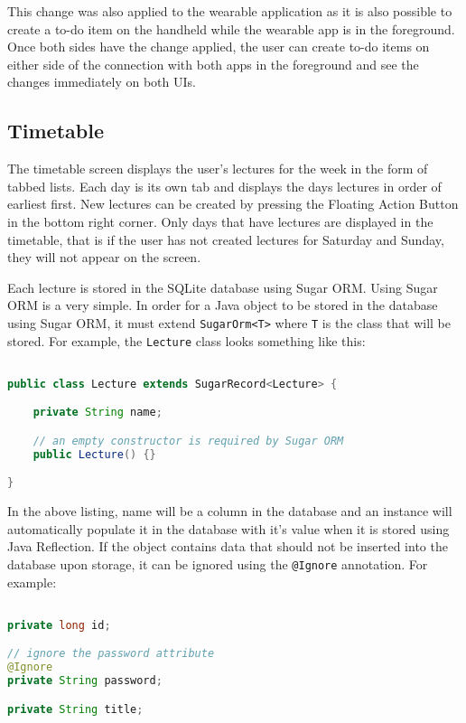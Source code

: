 This change was also applied to the wearable application as it is also possible
to create a to-do item on the handheld while the wearable app is in the
foreground. Once both sides have the change applied, the user can create to-do
items on either side of the connection with both apps in the foreground and see
the changes immediately on both UIs.

\subsection{Timetable}

The timetable screen displays the user's lectures for the week in the form of
tabbed lists. Each day is its own tab and displays the days lectures in order
of earliest first. New lectures can be created by pressing the Floating Action
Button in the bottom right corner. Only days that have lectures are displayed in
the timetable, that is if the user has not created lectures for Saturday and
Sunday, they will not appear on the screen.

Each lecture is stored in the SQLite database using Sugar ORM. Using Sugar ORM
is a very simple. In order for a Java object to be stored in the database using
Sugar ORM, it must extend \texttt{SugarOrm<T>} where \texttt{T} is the class
that will be stored. For example, the \texttt{Lecture} class looks something
like this:

\begin{lstlisting}[language=Java]

public class Lecture extends SugarRecord<Lecture> {

    private String name;

    // an empty constructor is required by Sugar ORM
    public Lecture() {}

}

\end{lstlisting}

In the above listing, name will be a column in the database and an instance will
automatically populate it in the database with it's value when it is stored
using Java Reflection. If the object contains data that should not be inserted
into the database upon storage, it can be ignored using the \texttt{@Ignore}
annotation. For example:

\begin{lstlisting}[language=Java]

private long id;

// ignore the password attribute
@Ignore
private String password;

private String title;

\end{lstlisting}

